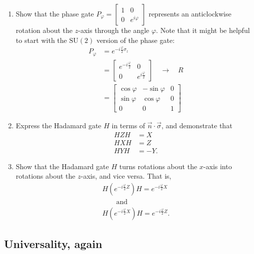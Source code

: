 \documentclass[fleqn]{article}
\begin{document}
\begin{enumerate}
\item
  Show that the phase gate \(P_\varphi =\begin{bmatrix}1&0\\0&e^{i\varphi}\end{bmatrix}\) represents an anticlockwise rotation about the \(z\)-axis through the angle \(\varphi\).
  Note that it might be helpful to start with the \(\mathrm{SU}(2)\) version of the phase gate:
  \[
     \begin{aligned}
       P_\varphi
       &= e^{-i\frac{\varphi}{2}\sigma_z}
     \\&= \begin{bmatrix}
         e^{-i \frac{\varphi}{2}}& 0
       \\0 & e^{i \frac{\varphi}{2}}
       \end{bmatrix}
       \quad\longrightarrow\quad
       R
     \\&= \begin{bmatrix}
         \cos \varphi & -\sin \varphi & 0
       \\\sin \varphi & \cos \varphi & 0
       \\0 & 0 & 1
       \end{bmatrix}
     \end{aligned}
   \]
\item
  Express the Hadamard gate \(H\) in terms of \(\vec{n}\cdot\vec{\sigma}\), and demonstrate that
  \[
     \begin{aligned}
       HZH&=X
     \\HXH&=Z
     \\HYH&=-Y.
     \end{aligned}
   \]
\item
  Show that the Hadamard gate \(H\) turns rotations about the \(x\)-axis into rotations about the \(z\)-axis, and vice versa.
  That is,
  \[
     \begin{gathered}
       H \left(
         e^{-i\frac{\varphi}{2}Z}
       \right) H
       = e^{-i\frac{\varphi}{2}X}
     \\\qquad \text{and} \qquad
     \\H \left(
         e^{-i\frac{\varphi}{2}X}
       \right) H
       = e^{-i\frac{\varphi}{2}Z}.
     \end{gathered}
   \]
\end{enumerate}

\hypertarget{universality-again}{%
\subsection{Universality, again}\label{universality-again}}
\end{document}
